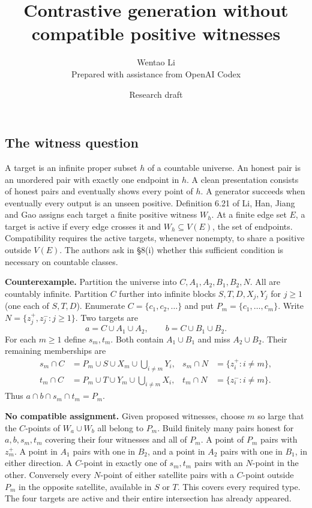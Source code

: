 \documentclass[11pt]{article}
\title{Contrastive generation without compatible positive witnesses}
\author{Wentao Li\\{\small Prepared with assistance from OpenAI Codex}}
\date{Research draft}
\begin{document}
\maketitle
\subsection{The witness question}\label{the-witness-question}

A target is an infinite proper subset \(h\) of a countable universe. An honest pair is an unordered pair with exactly one endpoint in \(h\). A clean presentation consists of honest pairs and eventually shows every point of \(h\). A generator succeeds when eventually every output is an unseen positive. Definition 6.21 of Li, Han, Jiang and Gao assigns each target a finite positive witness \(W_h\). At a finite edge set \(E\), a target is active if every edge crosses it and \(W_h\subseteq V(E)\), the set of endpoints. Compatibility requires the active targets, whenever nonempty, to share a positive outside \(V(E)\). The authors ask in §8(i) whether this sufficient condition is necessary on countable classes.

\textbf{Counterexample.} Partition the universe into \(C,A_1,A_2,B_1,B_2,N\). All are countably infinite. Partition \(C\) further into infinite blocks \(S,T,D,X_j,Y_j\) for \(j\geq1\) (one each of \(S,T,D\)). Enumerate \(C=\{c_1,c_2,\ldots\}\) and put \(P_m=\{c_1,\ldots,c_m\}\). Write \(N=\{z_j^+,z_j^-:j\geq1\}\). Two targets are
\[a=C\cup A_1\cup A_2,\qquad b=C\cup B_1\cup B_2.\]
For each \(m\geq1\) define \(s_m,t_m\). Both contain \(A_1\cup B_1\) and miss \(A_2\cup B_2\). Their remaining memberships are
\[\begin{aligned}
s_m\cap C &=P_m\cup S\cup X_m\cup\bigcup_{i\ne m}Y_i,&
s_m\cap N &=\{z_i^+:i\ne m\},\\
t_m\cap C &=P_m\cup T\cup Y_m\cup\bigcup_{i\ne m}X_i,&
t_m\cap N &=\{z_i^-:i\ne m\}.
\end{aligned}\]
Thus \(a\cap b\cap s_m\cap t_m=P_m\).

\textbf{No compatible assignment.} Given proposed witnesses, choose \(m\) so large that the \(C\)-points of \(W_a\cup W_b\) all belong to \(P_m\). Build finitely many pairs honest for \(a,b,s_m,t_m\) covering their four witnesses and all of \(P_m\). A point of \(P_m\) pairs with \(z_m^+\). A point in \(A_1\) pairs with one in \(B_2\), and a point in \(A_2\) pairs with one in \(B_1\), in either direction. A \(C\)-point in exactly one of \(s_m,t_m\) pairs with an \(N\)-point in the other. Conversely every \(N\)-point of either satellite pairs with a \(C\)-point outside \(P_m\) in the opposite satellite, available in \(S\) or \(T\). This covers every required type. The four targets are active and their entire intersection has already appeared.
\end{document}
